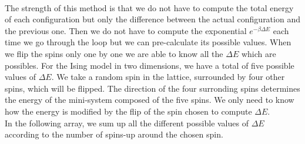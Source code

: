 \documentclass[a4paper, twoside, 11pt]{report}
\theoremstyle{theorem}
\theoremstyle{remark}
\theoremstyle{exemple}
\begin{document}
            \paragraph{}The strength of this method is that we do not have to compute the total energy of each configuration but only the difference between the actual configuration and the previous one. Then we do not have to compute the exponential $e^{-\beta \Delta E}$ each time we go through the loop but we can pre-calculate its possible values. When we flip the spins only one by one we are able to know all the $\Delta E$ which are possibles. For the Ising model in two dimensions, we have a total of five possible values of $\Delta E$. We take a random spin in the lattice, surrounded by four other spins, which will be flipped. The direction of the four surronding spins determines the energy of the mini-system composed of the five spins. We only need to know how the energy is modified by the flip of the spin chosen to compute $\Delta E$.\\
            In the following array, we sum up all the different possible values of $\Delta E$ according to the number of spins-up around the chosen spin.
            
\end{document}
